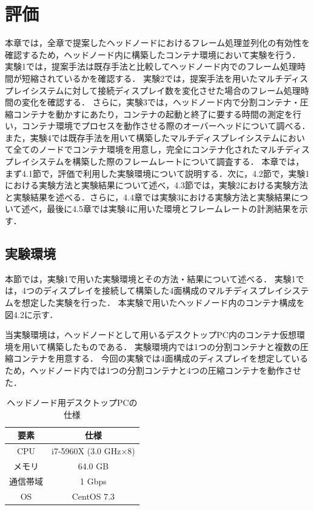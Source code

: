 \chapter{評価}
本章では，全章で提案したヘッドノードにおけるフレーム処理並列化の有効性を確認するため，ヘッドノード内に構築したコンテナ環境において実験を行う．
実験1では，提案手法は既存手法と比較してヘッドノード内でのフレーム処理時間が短縮されているかを確認する．
実験2では，提案手法を用いたマルチディスプレイシステムに対して接続ディスプレイ数を変化させた場合のフレーム処理時間の変化を確認する．
さらに，実験3では，ヘッドノード内で分割コンテナ・圧縮コンテナを動かすにあたり，コンテナの起動と終了に要する時間の測定を行い，コンテナ環境でプロセスを動作させる際のオーバーヘッドについて調べる．
また，実験4では既存手法を用いて構築したマルチディスプレイシステムにおいて全てのノードでコンテナ環境を用意し，完全にコンテナ化されたマルチディスプレイシステムを構築した際のフレームレートについて調査する．
本章では，まず4.1節で，評価で利用した実験環境について説明する．次に，4.2節で，実験1における実験方法と実験結果について述べ，4.3節では，実験2における実験方法と実験結果を述べる．さらに，4.4章では実験3における実験方法と実験結果について述べ，最後に4.5章では実験4に用いた環境とフレームレートの計測結果を示す．

\section{実験環境}
本節では，実験1で用いた実験環境とその方法・結果について述べる．
実験1では，4つのディスプレイを接続して構築した4面構成のマルチディスプレイシステムを想定した実験を行った．
本実験で用いたヘッドノード内のコンテナ構成を図4.2に示す．

当実験環境は，ヘッドノードとして用いるデスクトップPC内のコンテナ仮想環境を用いて構築したものである．
実験環境内では1つの分割コンテナと複数の圧縮コンテナを用意する．
今回の実験では4面構成のディスプレイを想定しているため，ヘッドノード内では1つの分割コンテナと4つの圧縮コンテナを動作させた．

\begin{table}[H]
    \caption{ヘッドノード用デスクトップPCの仕様}
    \begin{center}
    \begin{tabular}{cc}
    \hline
    要素 & 仕様 \\\hline\hline
    CPU & i7-5960X (3.0 GHz×8) \\ \hline
    メモリ & 64.0 GB \\ \hline
    通信帯域 & 1 Gbps \\ \hline
    OS & CentOS 7.3 \\ \hline

    \end{tabular}
    \end{center}
\end{table}

